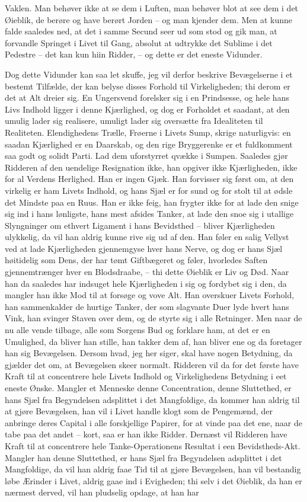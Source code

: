 \documentclass[12pt,a4paper]{article}
\begin{document}
Vaklen. Man behøver ikke at se dem i Luften, man behøver blot at see dem i det Øieblik, de berøre og have berørt Jorden – og man kjender dem. Men at kunne falde saaledes ned, at det i samme Secund seer ud som stod og gik man, at forvandle Springet i Livet til Gang, absolut at udtrykke det Sublime i det Pedestre – det kan kun hiin Ridder, – og dette er det eneste Vidunder.

Dog dette Vidunder kan saa let skuffe, jeg vil derfor beskrive Bevægelserne i et bestemt Tilfælde, der kan belyse disses Forhold til Virkeligheden; thi derom er det at Alt dreier sig. En Ungersvend forelsker sig i en Prindsesse, og hele hans Livs Indhold ligger i denne Kjærlighed, og dog er Forholdet et saadant, at den umulig lader sig realisere, umuligt lader sig oversætte fra Idealiteten til Realiteten. Elendighedens Trælle, Frøerne i Livets Sump, skrige naturligvis: en saadan Kjærlighed er en Daarskab, og den rige Bryggerenke er et fuldkomment saa godt og solidt Parti. Lad dem uforstyrret qvække i Sumpen. Saaledes gjør Ridderen af den uendelige Resignation ikke, han opgiver ikke Kjærligheden, ikke for al Verdens Herlighed. Han er ingen Gjæk. Han forvisser sig først om, at den virkelig er ham Livets Indhold, og hans Sjæl er for sund og for stolt til at ødsle det Mindste paa en Ruus. Han er ikke feig, han frygter ikke for at lade den snige sig ind i hans lønligste, hans mest afsides Tanker, at lade den snoe sig i utallige Slyngninger om ethvert Ligament i hans Bevidsthed – bliver Kjærligheden ulykkelig, da vil han aldrig kunne rive sig ud af den. Han føler en salig Vellyst ved at lade Kjærligheden gjennemgyse hver hans Nerve, og dog er hans Sjæl høitidelig som Dens, der har tømt Giftbægeret og føler, hvorledes Saften gjennemtrænger hver en Blodsdraabe, – thi dette Øieblik er Liv og Død. Naar han da saaledes har indsuget hele Kjærligheden i sig og fordybet sig i den, da mangler han ikke Mod til at forsøge og vove Alt. Han overskuer Livets Forhold, han sammenkalder de hurtige Tanker, der som slagvante Duer lyde hvert hans Vink, han svinger Staven over dem, og de styrte sig i alle Retninger. Men naar de nu alle vende tilbage, alle som Sorgens Bud og forklare ham, at det er en Umulighed, da bliver han stille, han takker dem af, han bliver ene og da foretager han sig Bevægelsen. Dersom hvad, jeg her siger, skal have nogen Betydning, da gjælder det om, at Bevægelsen skeer normalt. Ridderen vil da for det første have Kraft til at concentrere hele Livets Indhold og Virkelighedens Betydning i eet eneste Ønske. Mangler et Menneske denne Concentration, denne Sluttethed, er hans Sjæl fra Begyndelsen adsplittet i det Mangfoldige, da kommer han aldrig til at gjøre Bevægelsen, han vil i Livet handle klogt som de Pengemænd, der anbringe deres Capital i alle forskjellige Papirer, for at vinde paa det ene, naar de tabe paa det andet – kort, saa er han ikke Ridder. Dernæst vil Ridderen have Kraft til at concentrere hele Tanke-Operationens Resultat i een Bevidstheds-Akt. Mangler han denne Sluttethed, er hans Sjæl fra Begyndelsen adsplittet i det Mangfoldige, da vil han aldrig faae Tid til at gjøre Bevægelsen, han vil bestandig løbe Ærinder i Livet, aldrig gaae ind i Evigheden; thi selv i det Øieblik, da han er nærmest derved, vil han pludselig opdage, at han har 
\end{document}
